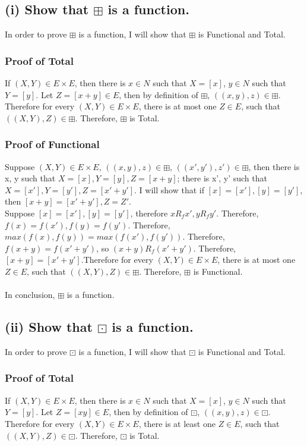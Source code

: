 \documentclass[]{article}
\begin{document}
\begin{spacing}{1.5}
		\subsection*{(i) Show that $ \boxplus $ is a function.}
		In order to prove $ \boxplus $ is a function, I will show that $ \boxplus $ is Functional and Total.
		\subsubsection*{Proof of Total}
		If $ (X,Y) \in E \times E$, then there is $ x \in N $ such that $ X=[x] $, $ y \in N $ such that $ Y=[y] $. Let $ Z = [x+y] \in E$, then by definition of $ \boxplus $, $ ((x,y),z) \in \boxplus $. Therefore for every $ (X,Y) \in E \times E$, there is at most one $ Z \in E $, such that $ ((X,Y),Z) \in \boxplus $. Therefore, $ \boxplus $ is Total.
		\subsubsection*{Proof of Functional}
		Suppose $ (X,Y) \in E \times E$, $ ((x,y),z) \in \boxplus $, $ ((x',y'),z') \in \boxplus $, then there is x, y such that  $ X=[x], Y=[y], Z = [x+y]$; there is x', y' such that  $ X=[x'], Y=[y'], Z = [x'+y']$. I will show that  if $ [x]=[x'], [y]=[y'] $, then $ [x+y]=[x'+y'], Z=Z' $.\\
		Suppose $ [x]=[x'], [y]=[y'] $, therefore $ x R_f x', y R_f y' $. Therefore, $ f(x)=f(x'), f(y)=f(y') $. Therefore, $ max(f(x),f(y)) = max(f(x'),f(y')) $. Therefore, $ f(x+y) = f(x'+y') $, so $ (x+y) R_f (x'+y') $. Therefore, $ [x+y] = [x'+y']. $Therefore for every $ (X,Y) \in E \times E$, there is at most one $ Z \in E $, such that $ ((X,Y),Z) \in \boxplus $. Therefore, $ \boxplus $ is Functional.\\
		~\\
		In conclusion, $ \boxplus $ is a function.
		\subsection*{(ii) Show that $ \boxdot $ is a function.}
		In order to prove $ \boxdot $ is a function, I will show that $ \boxdot $ is Functional and Total.
		\subsubsection*{Proof of Total}
		If $ (X, Y) \in E \times E$, then there is $ x \in N $ such that $ X=[x] $, $ y \in N $ such that $ Y=[y] $. Let $ Z = [xy] \in E$, then by definition of $ \boxdot $, $ ((x,y),z) \in \boxdot $. Therefore for every $ (X,Y) \in E \times E$, there is at least one $ Z \in E $, such that $ ((X,Y),Z) \in \boxdot $.  Therefore, $ \boxdot $ is Total.

\end{spacing}
\end{document}
